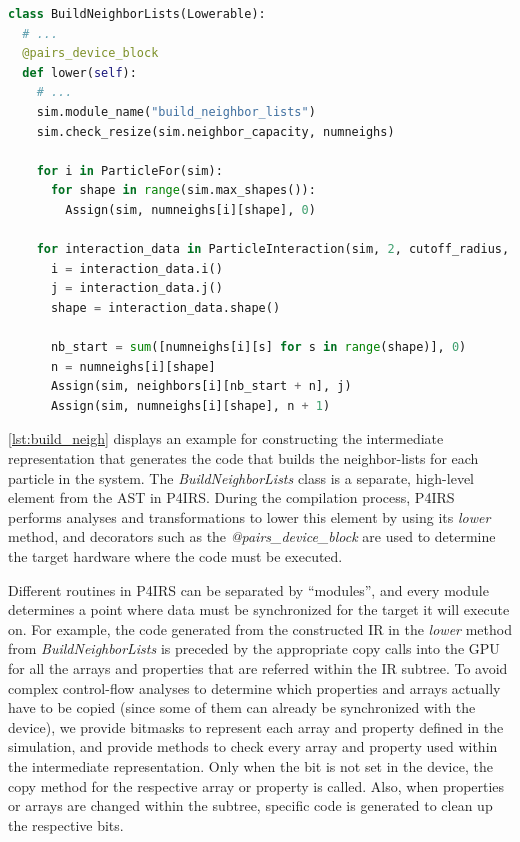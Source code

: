 \documentclass[Afour,sageh,times]{sagej}
\begin{document}
\begin{lstlisting}[language=Python,
                   label={lst:build_neigh},
                   caption={Neighbor-lists intermediate representation construction in P4IRS. Elements that are explicitly built for the AST (both high and low level) are shown in purple, and implicit elements such as expressions are constructed via operator-overloading and bound to a statement at some point in the construction.}]
class BuildNeighborLists(Lowerable):
  # ...
  @pairs_device_block
  def lower(self):
    # ...
    sim.module_name("build_neighbor_lists")
    sim.check_resize(sim.neighbor_capacity, numneighs)

    for i in ParticleFor(sim):
      for shape in range(sim.max_shapes()):
        Assign(sim, numneighs[i][shape], 0)

    for interaction_data in ParticleInteraction(sim, 2, cutoff_radius, use_cell_lists=True):
      i = interaction_data.i()
      j = interaction_data.j()
      shape = interaction_data.shape()

      nb_start = sum([numneighs[i][s] for s in range(shape)], 0)
      n = numneighs[i][shape]
      Assign(sim, neighbors[i][nb_start + n], j)
      Assign(sim, numneighs[i][shape], n + 1)
\end{lstlisting}

\autoref{lst:build_neigh} displays an example for constructing the intermediate representation that generates the code that builds the neighbor-lists for each particle in the system.
The \emph{BuildNeighborLists} class is a separate, high-level element from the AST in P4IRS.
During the compilation process, P4IRS performs analyses and transformations to lower this element by using its \emph{lower} method, and decorators such as the \emph{@pairs\_device\_block} are used to determine the target hardware where the code must be executed.

Different routines in P4IRS can be separated by ``modules'', and every module determines a point where data must be synchronized for the target it will execute on.
For example, the code generated from the constructed IR in the \emph{lower} method from \emph{BuildNeighborLists} is preceded by the appropriate copy calls into the GPU for all the arrays and properties that are referred within the IR subtree.
To avoid complex control-flow analyses to determine which properties and arrays actually have to be copied (since some of them can already be synchronized with the device), we provide bitmasks to represent each array and property defined in the simulation, and provide methods to check every array and property used within the intermediate representation.
Only when the bit is not set in the device, the copy method for the respective array or property is called.
Also, when properties or arrays are changed within the subtree, specific code is generated to clean up the respective bits.
\end{document}

